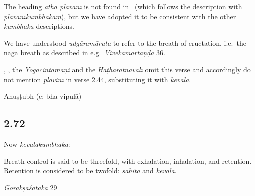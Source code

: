 \begin{ekdosis}
\begin{testimonia}[hp02_071]
\begin{versinnote}
\end{versinnote}
\end{testimonia}

\begin{philcomm}[hp02_071]
The heading \emph{atha plāvanī} is not found in \alphaOne \ (which follows the description with \emph{plāvanīkumbhakaṃ}), but we have adopted it to be consistent with the other \emph{kumbhaka} descriptions.

We have understood \emph{udgāramāruta} to refer to the breath of eructation, i.e.~the nāga breath as described in e.g.~\emph{Vivekamārtaṇḍa} 36.

, , the \emph{Yogacintāmaṇi} and the \emph{Haṭharatnāvalī} omit this verse and accordingly do not mention \emph{plāvinī} in verse 2.44, substituting it with \emph{kevala}.

\end{philcomm}

\begin{metre}[hp02_071]
Anuṣṭubh (c: bha-vipulā)
\end{metre}

\subsection*{2.72}
\begin{translation}[hp02_072]
Now \emph{kevalakumbhaka}:

Breath control is said to be threefold, with exhalation, inhalation, and retention. Retention is considered to be twofold: \emph{sahita} and \emph{kevala}.

\end{translation}

\begin{sources}[hp02_072]
\emph{Gorakṣaśataka} 29

\begin{versinnote}
\end{versinnote}


\end{sources}
\end{ekdosis}
